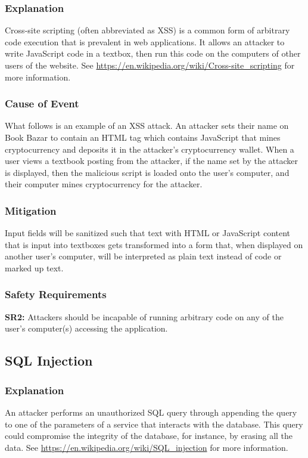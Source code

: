 \documentclass[fullpage]{article}
\begin{document}
\subsubsection*{Explanation}
Cross-site scripting (often abbreviated as XSS) is a common form of arbitrary code execution that is prevalent in web applications. It allows an attacker to write JavaScript code in a textbox, then run this code on the computers of other users of the website. See \url{https://en.wikipedia.org/wiki/Cross-site_scripting}  for more information.

\subsubsection*{Cause of Event}
What follows is an example of an XSS attack. An attacker sets their name on Book Bazar to contain an HTML tag which contains JavaScript that mines cryptocurrency and deposits it in the attacker’s cryptocurrency wallet. When a user views a textbook posting from the attacker, if the name set by the attacker is displayed, then the malicious script is loaded onto the user’s computer, and their computer mines cryptocurrency for the attacker.

\subsubsection*{Mitigation}
Input fields will be sanitized such that text with HTML or JavaScript content that is input into textboxes gets transformed into a form that, when displayed on another user's computer, will be interpreted as plain text instead of code or marked up text.

\subsubsection*{Safety Requirements}
\textbf{SR2: }Attackers should be incapable of running arbitrary code on any of the user's computer(s) accessing the application.

\subsection{SQL Injection}

\subsubsection*{Explanation}
An attacker performs an unauthorized SQL query through appending the query to one of the parameters of a service that interacts with the database. This query could compromise the integrity of the database, for instance, by erasing all the data. See \url{https://en.wikipedia.org/wiki/SQL_injection} for more information.
\end{document}
